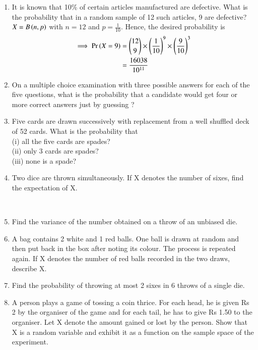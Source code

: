 \begin{enumerate}[label=\thesection.\arabic*.,ref=\thesection.\theenumi]
\item It is known that 10$\%$ of certain articles manufactured are defective. What is the probability that in a random sample of 12 such articles, 9 are defective?\\
\solution $X = B \left(n,p\right)$ with $n=12$ and $p=\frac{1}{10}$.  Hence, the desired probability is
%
\begin{align}
  \implies\Pr\left(X=9\right) &={12 \choose 9}\times\left(\frac{1}{10}\right)^9\times\left(\frac{9}{10}\right)^{3} \\  &=\frac{16038}{10^{11}}
\end{align}
\item On a multiple choice examination with three possible answers for each of the five questions, what is the probability that a candidate would get four or more correct answers just by guessing ?
\\
\solution


\item Five cards are drawn successively with replacement from a well shuffled deck of 52 cards. What is the probability that\\
(i) all the five cards are spades?\\
(ii) only 3 cards are spades?\\
(iii) none is a spade?\\
\solution 


\item Two dice are thrown simultaneously. If X denotes the number of sixes, find the
expectation of X.\\
\solution

\\
\item Find the variance of the number obtained on a throw of an unbiased die.\\

\item A bag contains 2 white and 1 red balls. One ball is drawn at random and then put back in the box after noting its colour. The process is repeated again. If X denotes the number of red balls recorded in the two draws, describe X.\\

\item Find the probability of throwing at most 2 sixes in 6 throws of a single die.\\
\solution

\item A person plays a game of tossing a coin thrice. For each head, he is given Rs 2 by the organiser of the game and for each tail, he has to give Rs 1.50 to the organiser. Let X denote the amount gained or lost by the person. Show that X is a random variable and exhibit it as a function on the sample space of the experiment.\\
\solution


\end{enumerate}


